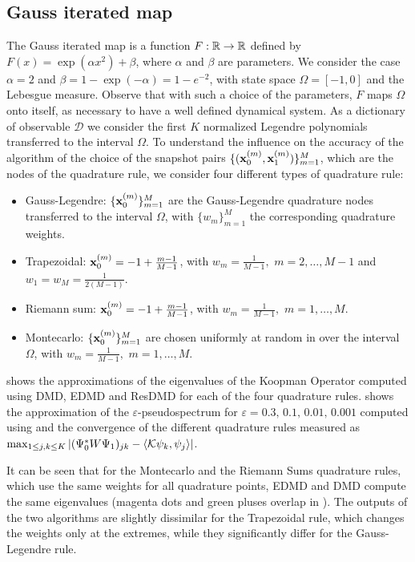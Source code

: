 \subsection{Gauss iterated map}
The Gauss iterated map is a function $F:\mathbb{R}\to\mathbb{R}$ defined by $F(x) =\exp(\alpha x^2) + \beta $, where $\alpha$ and $\beta$ are parameters. We consider the case $\alpha = 2$ and $\beta = 1-\exp(-\alpha) = 1 - e^{-2}$, with state space $\Omega = [-1, 0]$ and the Lebesgue measure. Observe that with such a choice of the parameters, $F$ maps $\Omega$ onto itself, as necessary to have a well defined dynamical system. As a dictionary of observable $\mathcal{D}$ we consider the first $K$ normalized Legendre polynomials transferred to the interval $\Omega$. To understand the influence on the accuracy of the algorithm of the choice of the snapshot pairs $\{(\vb{x}_0^{(m)}, \vb{x}_1^{(m)})\}_{m = 1}^M$, which are the nodes of the quadrature rule, we consider four different types of quadrature rule:
\begin{itemize}
    \item Gauss-Legendre: $\{\vb{x}_0^{(m)}\}_{m = 1}^M$ are the Gauss-Legendre quadrature nodes transferred to the interval $\Omega$, with $\{w_m\}_{m = 1}^M$ the corresponding quadrature weights.
    \item Trapezoidal: $\vb{x}_0^{(m)} = -1 + \frac{m-1}{M-1}$, with $w_m = \frac{1}{M-1},\,\,m = 2,\dots, M-1$ and $w_1 = w_M = \frac{1}{2(M-1)}$.
    \item Riemann sum: $\vb{x}_0^{(m)} = -1 + \frac{m-1}{M-1}$, with $w_m = \frac{1}{M-1},\,\,m = 1,\dots, M$.
    \item Montecarlo: $\{\vb{x}_0^{(m)}\}_{m = 1}^M$ are chosen uniformly at random in over the interval $\Omega$, with $w_m = \frac{1}{M-1},\,\,m = 1,\dots, M$. 
\end{itemize}

 shows the approximations of the eigenvalues of the Koopman Operator computed using DMD, EDMD and ResDMD for each of the four quadrature rules.  shows the approximation of the $\varepsilon$-pseudospectrum for $\varepsilon = 0.3,\,0.1,\,0.01,\,0.001$ computed using  and the convergence of the different quadrature rules measured as $\max_{1\leq j,k \leq K} \abs{(\Psi_0^* W \Psi_1)_{jk} - \langle\mathcal{K}\psi_k, \psi_j\rangle}$.

It can be seen that for the Montecarlo and the Riemann Sums quadrature rules, which use the same weights for all quadrature points, EDMD and DMD compute the same eigenvalues (magenta dots and green pluses overlap in ). The outputs of the two algorithms are slightly dissimilar for the Trapezoidal rule, which changes the weights only at the extremes, while they significantly differ for the Gauss-Legendre rule.

